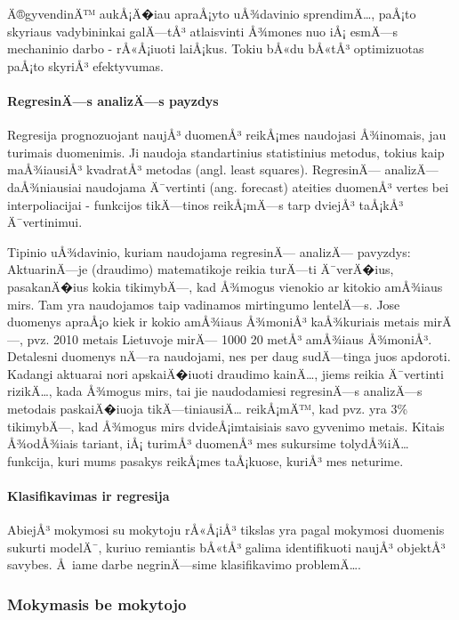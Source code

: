 Ä®gyvendinÄ™ aukÅ¡Ä�iau apraÅ¡yto uÅ¾davinio sprendimÄ…, paÅ¡to skyriaus vadybininkai
galÄ—tÅ³ atlaisvinti Å¾mones nuo iÅ¡ esmÄ—s mechaninio darbo - rÅ«Å¡iuoti laiÅ¡kus.
Tokiu bÅ«du bÅ«tÅ³ optimizuotas paÅ¡to skyriÅ³ efektyvumas.

\paragraph{RegresinÄ—s analizÄ—s payzdys}

Regresija prognozuojant naujÅ³ duomenÅ³ reikÅ¡mes naudojasi Å¾inomais, jau turimais
duomenimis. Ji naudoja standartinius statistinius metodus, tokius kaip maÅ¾iausiÅ³
kvadratÅ³ metodas (angl. least squares). RegresinÄ— analizÄ— daÅ¾niausiai naudojama
Ä¯vertinti (ang. forecast) ateities duomenÅ³ vertes bei interpoliacijai -
funkcijos tikÄ—tinos reikÅ¡mÄ—s tarp dviejÅ³ taÅ¡kÅ³ Ä¯vertinimui.

Tipinio uÅ¾davinio, kuriam naudojama regresinÄ— analizÄ— pavyzdys: AktuarinÄ—je
(draudimo) matematikoje reikia turÄ—ti Ä¯verÄ�ius, pasakanÄ�ius kokia tikimybÄ—, kad
Å¾mogus vienokio ar kitokio amÅ¾iaus mirs. Tam yra naudojamos taip vadinamos 
mirtingumo lentelÄ—s. Jose duomenys apraÅ¡o kiek ir kokio amÅ¾iaus Å¾moniÅ³
kaÅ¾kuriais metais mirÄ—, pvz. 2010 metais Lietuvoje mirÄ— 1000 20 metÅ³ amÅ¾iaus 
Å¾moniÅ³. Detalesni duomenys nÄ—ra naudojami, nes per daug sudÄ—tinga juos apdoroti.
Kadangi aktuarai nori apskaiÄ�iuoti draudimo kainÄ…, jiems reikia Ä¯vertinti
rizikÄ…, kada Å¾mogus mirs, tai jie naudodamiesi regresinÄ—s analizÄ—s metodais 
paskaiÄ�iuoja tikÄ—tiniausiÄ… reikÅ¡mÄ™, kad pvz. yra 3\% tikimybÄ—, kad Å¾mogus  mirs
dvideÅ¡imtaisiais savo gyvenimo metais. Kitais Å¾odÅ¾iais tariant, iÅ¡ turimÅ³
duomenÅ³ mes sukursime tolydÅ¾iÄ… funkcija, kuri mums pasakys reikÅ¡mes taÅ¡kuose,
kuriÅ³ mes neturime.

\paragraph{Klasifikavimas ir regresija}

AbiejÅ³ mokymosi su mokytoju rÅ«Å¡iÅ³ tikslas yra pagal mokymosi duomenis sukurti
modelÄ¯, kuriuo remiantis bÅ«tÅ³ galima identifikuoti naujÅ³ objektÅ³
savybes.\cite{markhall99} Å iame darbe negrinÄ—sime klasifikavimo problemÄ….

\subsubsection{Mokymasis be mokytojo}

